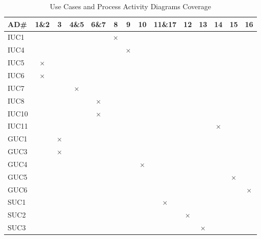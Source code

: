\begin{table}
    \centering
    \bgroup
    \def\arraystretch{1.5}
    \begin{tabular}{|l|c|c|c|c|c|c|c|c|c|c|c|c|c|}
    \hline
         AD\# & 1\&2 & 3 & 4\&5 & 6\&7 & 8 & 9 & 10 & 11\&17 & 12 & 13 & 14 & 15 & 16 \\ \hline
        IUC1 &  &  &  &  & × &  &  &  &  &  &  &  &  \\ \hline
        IUC4 &  &  &  &  &  & × &  &  &  &  &  &  &  \\ \hline
        IUC5 & × &  &  &  &  &  &  &  &  &  &  &  &  \\ \hline
        IUC6 & × &  &  &  &  &  &  &  &  &  &  &  &  \\ \hline
        IUC7 &  &  & × &  &  &  &  &  &  &  &  &  &  \\ \hline
        IUC8 &  &  &  & × &  &  &  &  &  &  &  &  &  \\ \hline
        IUC10 &  &  &  & × &  &  &  &  &  &  &  &  &  \\ \hline
        IUC11 &  &  &  &  &  &  &  &  &  &  & × &  &  \\ \hline
        GUC1 &  & × &  &  &  &  &  &  &  &  &  &  &  \\ \hline
        GUC3 &  & × &  &  &  &  &  &  &  &  &  &  &  \\ \hline
        GUC4 &  &  &  &  &  &  & × &  &  &  &  &  &  \\ \hline
        GUC5 &  &  &  &  &  &  &  &  &  &  &  & × &  \\ \hline
        GUC6 &  &  &  &  &  &  &  &  &  &  &  &  & × \\ \hline
        SUC1 &  &  &  &  &  &  &  & × &  &  &  &  &  \\ \hline
        SUC2 &  &  &  &  &  &  &  &  & × &  &  &  &  \\ \hline
        SUC3 &  &  &  &  &  &  &  &  &  & × &  &  &  \\ \hline
    \end{tabular}
    \egroup
    \caption{Use Cases and Process Activity Diagrams Coverage}
\end{table}